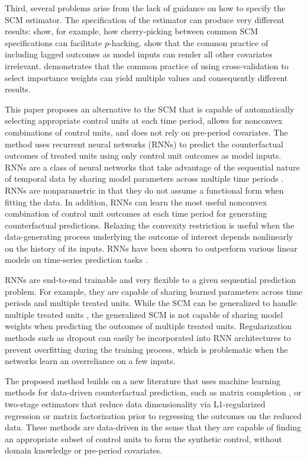 Third, several problems arise from the lack of guidance on how to specify the SCM estimator. The specification of the estimator can produce very different results: \citet{ferman2018cherry} show, for example, how cherry-picking between common SCM specifications can facilitate $p$-hacking. \citet{kaul2015synthetic} show that the common practice of including lagged outcomes as model inputs can render all other covariates irrelevant. \citet{klossner2017comparative} demonstrates that the common practice of using cross-validation to select importance weights can yield multiple values and consequently different results. 

This paper proposes an alternative to the SCM that is capable of automatically selecting appropriate control units at each time period, allows for nonconvex combinations of control units, and does not rely on pre-period covariates. The method uses recurrent neural networks (RNNs) to predict the counterfactual outcomes of treated units using only control unit outcomes as model inputs. RNNs are a class of neural networks that take advantage of the sequential nature of temporal data by sharing model parameters across multiple time periods \citep{el1995}. RNNs are nonparametric in that they do not assume a functional form when fitting the data. In addition, RNNs can learn the most useful nonconvex combination of control unit outcomes at each time period for generating counterfactual predictions. Relaxing the convexity restriction is useful when the data-generating process underlying the outcome of interest depends nonlinearly on the history of its inputs. RNNs have been shown to outperform various linear models on time-series prediction tasks \citep{cinar2017position}. 

RNNs are end-to-end trainable and very flexible to a given sequential prediction problem. For example, they are capable of sharing learned parameters across time periods and multiple treated units. While the SCM can be generalized to handle multiple treated units \citep[e.g.,][]{dube2015pooling,xu2017generalized}, the generalized SCM is not capable of sharing model weights when predicting the outcomes of multiple treated units. Regularization methods such as dropout can easily be incorporated into RNN architectures to prevent overfitting during the training process, which is problematic when the networks learn an overreliance on a few inputs.

The proposed method builds on a new literature that uses machine learning methods for data-driven counterfactual prediction, such as matrix completion \citep{athey2017matrix}, or two-stage estimators that reduce data dimensionality via L1-regularized regression \citep{doudchenko2016balancing,carvalho2018arco} or matrix factorization \citep{amjad2018robust} prior to regressing the outcomes on the reduced data. These methods are data-driven in the sense that they are capable of finding an appropriate subset of control units to form the synthetic control, without domain knowledge or pre-period covariates. 

